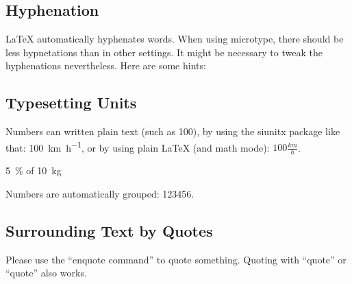 \documentclass[peerreview,a4paper,english]{IEEEtran}[2015/08/26]
\begin{document}
\subsection{Hyphenation}
\LaTeX{} automatically hyphenates words.
When using microtype, there should be less hypnetations than in other settings.
It might be necessary to tweak the hyphenations nevertheless.
Here are some hints:
\subsection{Typesetting Units}
\begin{ltgexample}
Numbers can written plain text (such as 100), by using the siunitx package like that:
\SI{100}{\km\per\hour},
or by using plain \LaTeX{} (and math mode):
$100 \frac{\mathit{km}}{h}$.
\end{ltgexample}
\begin{ltgexample}
\SI{5}{\percent} of \SI{10}{kg}
\end{ltgexample}
\begin{ltgexample}
Numbers are automatically grouped: \num{123456}.
\end{ltgexample}
\subsection{Surrounding Text by Quotes}
\begin{ltgexample}
Please use the \enquote{enquote command} to quote something.
Quoting with "`quote"' or ``quote'' also works.
\end{ltgexample}
\end{document}
